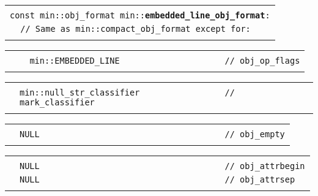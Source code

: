 \documentclass[12pt]{article}
\makeatletter
\newcommand{\TT}[1]{{\tt \bfseries #1}}
\newcommand{\ttindex}[1]{\index{#1@{\tt #1}}}
\newenvironment{indpar}[1][0.3in]%
	{\begin{list}{}%
		     {\setlength{\itemsep}{0in}%
		      \setlength{\topsep}{0in}%
		      \setlength{\parsep}{1ex}%
		      \setlength{\labelwidth}{#1}%
		      \setlength{\leftmargin}{#1}%
		      \addtolength{\leftmargin}{\labelsep}}%
	 \item}%
	{\end{list}}
\newcommand{\LABEL}[1]{\label{#1}}
\newlength{\ARGBREAKLENGTH}
\newcommand{\ARGBREAK}[1][\ARGBREAKLENGTH]{\\&\hspace*{#1}}
\newcommand{\MINKEY}[1]%
	   {\TT{#1}\ttindex{min::#1}\ttindex{#1}}
\makeatother
\begin{document}
\begin{indpar}[1em]

\begin{tabular}{r@{}l}\hspace*{0.1in} \\[-3ex]
\multicolumn{2}{l}{\tt const min::obj\_format
                   min::\MINKEY{embedded\_line\_obj\_format}:}%
\LABEL{MIN::EMBEDDED_LINE_OBJ_FORMAT}\ARGBREAK
\verb|// Same as min::compact_obj_format except for:|\ARGBREAK
\end{tabular}

\vspace{-4ex}\begin{tabular}{r@{}l}\hspace*{0.1in}\ARGBREAK
\verb|  min::EMBEDDED_LINE                     // obj_op_flags|\ARGBREAK
\end{tabular}

\vspace{-4ex}\begin{tabular}{r@{}l}\hspace*{0.1in}\ARGBREAK
\verb|min::null_str_classifier                 // mark_classifier|\ARGBREAK
\end{tabular}

\vspace{-4ex}\begin{tabular}{r@{}l}\hspace*{0.1in}\ARGBREAK
\verb|NULL                                     // obj_empty|\ARGBREAK
\end{tabular}

\vspace{-4ex}\begin{tabular}{r@{}l}\hspace*{0.1in}\ARGBREAK
\verb|NULL                                     // obj_attrbegin|\ARGBREAK
\verb|NULL                                     // obj_attrsep|\ARGBREAK
\end{tabular}

\end{indpar}
\end{document}
